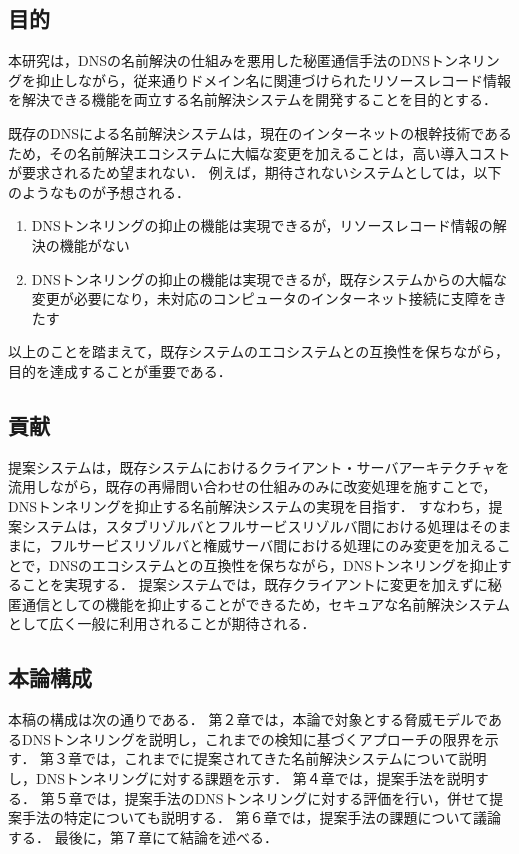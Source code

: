 \subsection{目的}
本研究は，DNSの名前解決の仕組みを悪用した秘匿通信手法のDNSトンネリングを抑止しながら，従来通りドメイン名に関連づけられたリソースレコード情報を解決できる機能を両立する名前解決システムを開発することを目的とする．

既存のDNSによる名前解決システムは，現在のインターネットの根幹技術であるため，その名前解決エコシステムに大幅な変更を加えることは，高い導入コストが要求されるため望まれない．
例えば，期待されないシステムとしては，以下のようなものが予想される．
\begin{enumerate}
 \setlength{\itemsep}{-0.5mm}
 \item DNSトンネリングの抑止の機能は実現できるが，リソースレコード情報の解決の機能がない
 \item DNSトンネリングの抑止の機能は実現できるが，既存システムからの大幅な変更が必要になり，未対応のコンピュータのインターネット接続に支障をきたす
\end{enumerate}
以上のことを踏まえて，既存システムのエコシステムとの互換性を保ちながら，目的を達成することが重要である．

\subsection{貢献}
提案システムは，既存システムにおけるクライアント・サーバアーキテクチャを流用しながら，既存の再帰問い合わせの仕組みのみに改変処理を施すことで，DNSトンネリングを抑止する名前解決システムの実現を目指す．
すなわち，提案システムは，スタブリゾルバとフルサービスリゾルバ間における処理はそのままに，フルサービスリゾルバと権威サーバ間における処理にのみ変更を加えることで，DNSのエコシステムとの互換性を保ちながら，DNSトンネリングを抑止することを実現する．
提案システムでは，既存クライアントに変更を加えずに秘匿通信としての機能を抑止することができるため，セキュアな名前解決システムとして広く一般に利用されることが期待される．





\subsection{本論構成}
本稿の構成は次の通りである．
第２章では，本論で対象とする脅威モデルであるDNSトンネリングを説明し，これまでの検知に基づくアプローチの限界を示す．
第３章では，これまでに提案されてきた名前解決システムについて説明し，DNSトンネリングに対する課題を示す．
第４章では，提案手法を説明する．
第５章では，提案手法のDNSトンネリングに対する評価を行い，併せて提案手法の特定についても説明する．
第６章では，提案手法の課題について議論する．
最後に，第７章にて結論を述べる．
